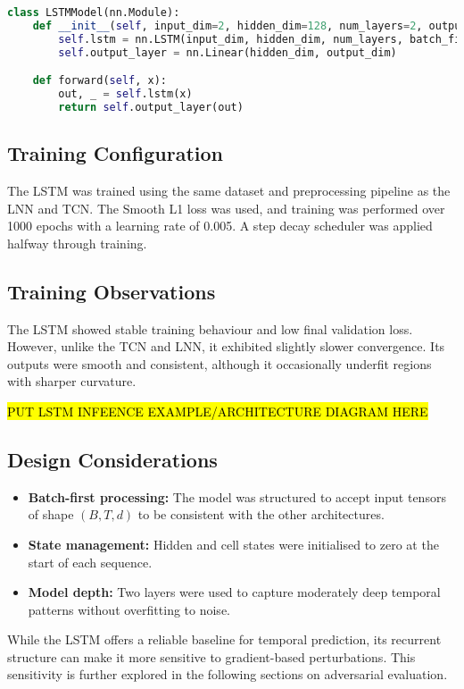 \begin{lstlisting}[language=Python, caption={Simplified LSTM model structure}]
class LSTMModel(nn.Module):
    def __init__(self, input_dim=2, hidden_dim=128, num_layers=2, output_dim=2):
        self.lstm = nn.LSTM(input_dim, hidden_dim, num_layers, batch_first=True)
        self.output_layer = nn.Linear(hidden_dim, output_dim)

    def forward(self, x):
        out, _ = self.lstm(x)
        return self.output_layer(out)
\end{lstlisting}

\subsection{Training Configuration}
The LSTM was trained using the same dataset and preprocessing pipeline as the LNN and TCN. The Smooth L1 loss was used, and training was performed over 1000 epochs with a learning rate of 0.005. A step decay scheduler was applied halfway through training.

\subsection{Training Observations}
The LSTM showed stable training behaviour and low final validation loss. However, unlike the TCN and LNN, it exhibited slightly slower convergence. Its outputs were smooth and consistent, although it occasionally underfit regions with sharper curvature.

\hl{PUT LSTM INFEENCE EXAMPLE/ARCHITECTURE DIAGRAM HERE}


\subsection{Design Considerations}
\begin{itemize}
    \item \textbf{Batch-first processing:} The model was structured to accept input tensors of shape $(B, T, d)$ to be consistent with the other architectures.
    \item \textbf{State management:} Hidden and cell states were initialised to zero at the start of each sequence.
    \item \textbf{Model depth:} Two layers were used to capture moderately deep temporal patterns without overfitting to noise.
\end{itemize}

While the LSTM offers a reliable baseline for temporal prediction, its recurrent structure can make it more sensitive to gradient-based perturbations. This sensitivity is further explored in the following sections on adversarial evaluation.